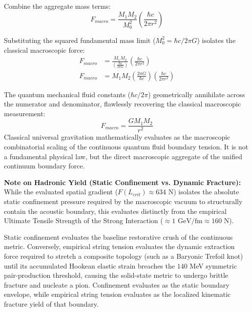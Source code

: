 \documentclass[11pt, a4paper]{article}
\begin{document}
Combine the aggregate mass terms:
\begin{equation}
    F_{macro} = \frac{M_1 M_2}{M_0^2} \left( \frac{\hbar c}{2\pi r^2} \right) \nonumber
\end{equation}

Substituting the squared fundamental mass limit ($M_0^2 = \hbar c / 2\pi G$) isolates the classical macroscopic force:
\begin{align}
    F_{macro} &= \frac{M_1 M_2}{\left( \frac{\hbar c}{2\pi G} \right)} \left( \frac{\hbar c}{2\pi r^2} \right) \nonumber \\
    F_{macro} &= M_1 M_2 \left( \frac{2\pi G}{\hbar c} \right) \left( \frac{\hbar c}{2\pi r^2} \right) \nonumber
\end{align}

The quantum mechanical fluid constants ($\hbar c / 2\pi$) geometrically annihilate across the numerator and denominator, flawlessly recovering the classical macroscopic measurement:
\begin{equation}
    F_{macro} = \frac{G M_1 M_2}{r^2} 
\end{equation}
Classical universal gravitation mathematically evaluates   as the macroscopic combinatorial scaling of the continuous quantum fluid boundary tension. It is not a fundamental physical law, but the direct macroscopic aggregate of the unified continuum boundary force.

\textbf{Note on Hadronic Yield (Static Confinement vs. Dynamic Fracture):} \\
While the evaluated spatial gradient ($F(L_{crit}) \approx 634 \text{ N}$) isolates the absolute static confinement pressure required by the macroscopic vacuum to structurally contain the acoustic boundary, this evaluates distinctly from the empirical Ultimate Tensile Strength of the Strong Interaction ($\approx 1 \text{ GeV/fm} \approx 160 \text{ N}$). 

Static confinement evaluates the baseline restorative crush of the continuous metric. Conversely, empirical string tension evaluates the dynamic extraction force required to stretch a composite topology (such as a Baryonic Trefoil knot) until its accumulated Hookean elastic strain breaches the $140$ MeV symmetric pair-production threshold, causing the solid-state metric to undergo brittle fracture and nucleate a pion. Confinement evaluates as the static boundary envelope, while empirical string tension evaluates as the localized kinematic fracture yield of that boundary.
\end{document}
